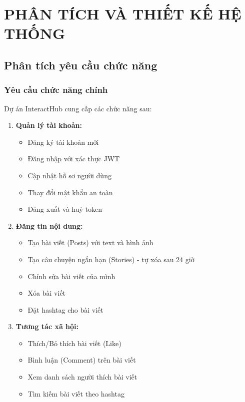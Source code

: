 \chapter{PHÂN TÍCH VÀ THIẾT KẾ HỆ THỐNG}

\section{Phân tích yêu cầu chức năng}

\subsection{Yêu cầu chức năng chính}
Dự án InteractHub cung cấp các chức năng sau:

\begin{enumerate}
    \item \textbf{Quản lý tài khoản:}
    \begin{itemize}
        \item Đăng ký tài khoản mới
        \item Đăng nhập với xác thực JWT
        \item Cập nhật hồ sơ người dùng
        \item Thay đổi mật khẩu an toàn
        \item Đăng xuất và huỷ token
    \end{itemize}

    \item \textbf{Đăng tin nội dung:}
    \begin{itemize}
        \item Tạo bài viết (Posts) với text và hình ảnh
        \item Tạo câu chuyện ngắn hạn (Stories) - tự xóa sau 24 giờ
        \item Chỉnh sửa bài viết của mình
        \item Xóa bài viết
        \item Đặt hashtag cho bài viết
    \end{itemize}

    \item \textbf{Tương tác xã hội:}
    \begin{itemize}
        \item Thích/Bỏ thích bài viết (Like)
        \item Bình luận (Comment) trên bài viết
        \item Xem danh sách người thích bài viết
        \item Tìm kiếm bài viết theo hashtag
    \end{itemize}


\end{enumerate}
